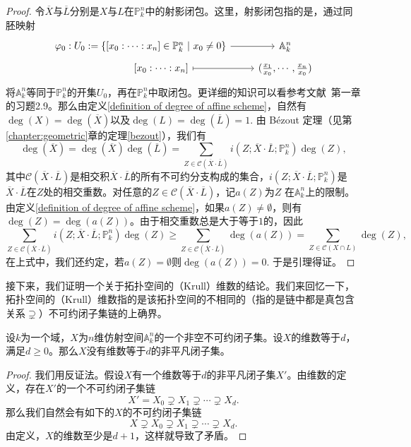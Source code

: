 \begin{proof}
令$\overline{X}$与$\overline{L}$分别是$X$与$L$在$\mathbb{P}^n_k$中的射影闭包。这里，射影闭包指的是，通过同胚映射
$$
\begin{tikzcd}[row sep = tiny]
\varphi_0: U_0 := \left\{ [x_0:\cdots:x_n] \in \mathbb{P}^n_k \ \middle|\ x_0\neq 0 \right\} \arrow[r] & \mathbb{A}^n_k \\
\phantom{hehehehe} [x_0:\cdots:x_n] \arrow[r, mapsto] & (\frac{x_1}{x_0},\cdots,\frac{x_n}{x_0})
\end{tikzcd}
$$
将$\mathbb{A}^n_k$等同于$\mathbb{P}^n_k$的开集$U_0$，再在$\mathbb{P}^n_k$中取闭包。更详细的知识可以看参考文献~第一章的习题2.9。那么由定义\ref{definition of degree of affine scheme}，自然有$\deg(X) = \deg(\overline{X})$以及$\deg(L) = \deg(\overline{L}) = 1.$ 由 B\'ezout 定理（见第\ref{chapter:geometric}章的定理\ref{bezout}），我们有
\begin{equation}
\deg(\overline{X}) = \deg(\overline{X}) \deg(\overline{L}) = \sum_{Z\in\mathcal{C}(\overline{X}\cdot\overline{L})} i(Z; \overline{X}\cdot\overline{L}; \mathbb{P}^n_k)\deg(Z),
\end{equation}
其中$\mathcal{C}(\overline{X}\cdot\overline{L})$是相交积$\overline{X}\cdot\overline{L}$的所有不可约分支构成的集合，$i(Z; \overline{X}\cdot\overline{L}; \mathbb{P}^n_k)$是$\overline{X}\cdot\overline{L}$在$Z$处的相交重数。对任意的$Z\in\mathcal{C}(\overline{X}\cdot\overline{L})$，记$a(Z)$为$Z$ 在$\mathbb{A}^n_k$上的限制。由定义\ref{definition of degree of affine scheme}，如果$a(Z)\neq\emptyset$，则有$\deg(Z) = \deg(a(Z))$。由于相交重数总是大于等于$1$的，因此
\begin{equation}
\sum_{Z\in\mathcal{C}(\overline{X}\cdot\overline{L})} i(Z; \overline{X}\cdot\overline{L}; \mathbb{P}_k^n) \deg(Z) \geqslant \sum_{Z\in\mathcal{C}(\overline{X}\cdot\overline{L})} \deg(a(Z)) = \sum_{Z\in\mathcal{C}(X\cap L)}\deg(Z),
\end{equation}
在上式中，我们还约定，若$a(Z) = \emptyset$则$\deg(a(Z)) = 0.$ 于是引理得证。
\end{proof}

接下来，我们证明一个关于拓扑空间的（Krull）维数的结论。我们来回忆一下，拓扑空间的（Krull）维数指的是该拓扑空间的不相同的（指的是链中都是真包含关系$\supsetneq$）不可约闭子集链的上确界。

\begin{lemma} \label{irreudicible closed subset}
设$k$为一个域，$X$为$n$维仿射空间$\mathbb{A}^n_k$的一个非空不可约闭子集。设$X$的维数等于$d$，满足$d \geqslant 0$。那么$X$没有维数等于$d$的非平凡闭子集。
\end{lemma}
\begin{proof}
我们用反证法。假设$X$有一个维数等于$d$的非平凡闭子集$X'$。由维数的定义，存在$X'$的一个不可约闭子集链
\begin{equation}
X' = X_0 \supsetneq X_1 \supsetneq \cdots \supsetneq X_d.
\end{equation}
那么我们自然会有如下的$X$的不可约闭子集链
\begin{equation}
X \supsetneq X_0 \supsetneq X_1 \supsetneq \cdots \supsetneq X_d.
\end{equation}
由定义，$X$的维数至少是$d+1$，这样就导致了矛盾。
\end{proof}

